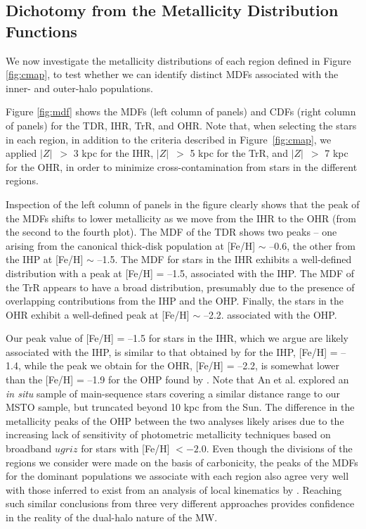 \documentclass[iop]{emulateapj}
\newcommand*{\z}{$|Z|$}
\begin{document}
\subsection{Dichotomy from the Metallicity Distribution Functions}

We now investigate the metallicity distributions of each region defined in Figure
\ref{fig:cmap}, to test whether we can identify distinct MDFs
associated with the inner- and outer-halo populations.

Figure \ref{fig:mdf} shows the MDFs (left column of panels) and
CDFs (right column of panels) for the TDR, IHR, TrR, and OHR. Note 
that, when selecting the stars in each
region, in addition to the criteria described in Figure~\ref{fig:cmap},
we applied \z\ $>$ 3 kpc for the IHR, \z\ $>$ 5 kpc for the TrR, and \z\
$>$ 7 kpc for the OHR, in order to minimize cross-contamination from
stars in the different regions.

Inspection of the left column of panels in the figure clearly shows that
the peak of the MDFs shifts to lower metallicity as we move from the IHR
to the OHR (from the second to the fourth plot). The MDF of the TDR
shows two peaks -- one arising from the canonical thick-disk
population at [Fe/H] $\sim$ --0.6, the other from the IHP at [Fe/H]
$\sim$ --1.5. The MDF for stars in the IHR exhibits a well-defined
distribution with a peak at [Fe/H] = --1.5, associated with the IHP. The
MDF of the TrR appears to have a broad distribution, presumably due to the
presence of overlapping contributions from the IHP and the OHP. Finally,
the stars in the OHR exhibit a well-defined peak at [Fe/H] $\sim$ --2.2.
associated with the OHP.

Our peak value of [Fe/H] = --1.5 for stars in the IHR, which we argue
are likely associated with the IHP, is similar to that obtained by \citet{an2015} for
the IHP, [Fe/H] = --1.4, while the peak we obtain for the
OHR, [Fe/H] = --2.2, is somewhat lower than the [Fe/H] = --1.9 for
the OHP found by \citet{an2015}. Note that An et al. explored an {\it in
situ} sample of main-sequence stars covering a similar distance range to 
our MSTO sample, but truncated beyond 10 kpc from the Sun. The
difference in the metallicity peaks of the OHP between the two analyses
likely arises due to the increasing lack of sensitivity of photometric metallicity
techniques based on broadband $ugriz$ for stars with [Fe/H] $< -2.0$.
Even though the divisions of the regions we consider were made on the
basis of carbonicity, the peaks of the MDFs for the dominant populations
we associate with each region also agree very well with those inferred
to exist from an analysis of local kinematics by \citet{carollo2007, carollo2010}.
Reaching such similar conclusions from three very
different approaches provides confidence in the reality of the dual-halo
nature of the MW.
\end{document}

